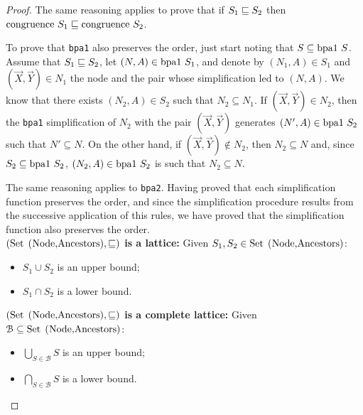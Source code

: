 \begin{proof}
	The same reasoning applies to prove that if $S_1\sqsubseteq S_2$ then 
	$\text{\lstinline{congruence} } S_1\leqSets\text{\lstinline{congruence} }S_2$.
	
	To prove that \lstinline{bpa1} also preserves the order, just start
	noting that 
	$S \subseteq \text{\lstinline{bpa1} }S$. Assume that 
	$S_1\sqsubseteq S_2$, let $(N,A)\in \text{\lstinline{bpa1} }S_1$, 
	and denote by $(N_1,A)\in S_1$ and $(\vec X,\vec Y)\in N_1$  
	the node and the pair whose simplification 
	led to $(N,A)$. We know that there exists $(N_2,A)\in S_2$
	such that $N_2 \subseteq N_1$. If $(\vec X,\vec Y)\in N_2$,
	then the \lstinline{bpa1} simplification of $N_2$ with
	the pair $(\vec X,\vec Y)$ generates 
	$(N',A)\in \text{\lstinline{bpa1} }S_2$ such that 
	$N'\subseteq N$. On the other hand, if 
	$(\vec X,\vec Y)\not \in N_2$, then $N_2\subseteq N$ 
	and, since  $S_2 \subseteq \text{\lstinline{bpa1} }S_2$,
	$(N_2,A)\in \text{\lstinline{bpa1} }S_2$ is such that
	$N_2\subseteq N$.
	
	The same reasoning applies to \lstinline{bpa2}. Having proved
	that each simplification function preserves the order, and
	since the simplification procedure results from the successive 
	application of this rules, we have proved that the simplification
	function also preserves the order.\\
	
	\noindent\textbf{$(\text{\lstinline{Set (Node,Ancestors)}}, \leqSets)$
	is a lattice:} Given 
	$S_1, S_2\in \text{\lstinline{Set (Node,Ancestors)}}$:
	\begin{itemize}
		\item $S_1 \cup S_2$ is an upper bound;
		\item $S_1 \cap S_2$ is a lower bound.
	\end{itemize}
	
	\noindent\textbf{$(\text{\lstinline{Set (Node,Ancestors)}}, \leqSets)$
	is a complete lattice:} Given 
	$\mathcal{B}\subseteq \text{\lstinline{Set (Node,Ancestors)}}$:
	\begin{itemize}
		\item $\bigcup_{S\in \mathcal{B}} S$ is an upper bound;
		\item $\bigcap_{S\in \mathcal{B}} S$ is a lower bound.
	\end{itemize}
	

\end{proof}
